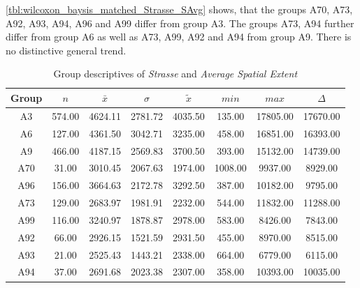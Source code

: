 \cref{tbl:wilcoxon_baysis_matched_Strasse_SAvg} shows, that the groups A70, A73, A92, A93, A94, A96 and A99 differ from group A3. The groups A73, A94 further differ from group A6 as well as A73, A99, A92 and A94 from group A9. There is no distinctive general trend.
\begin{table}[ht]
	\tiny
	\centering
	\begin{tabular}{c|c|c|c|c|c|c|c}
	  	\toprule
	 	Group & $n$ & $\bar{x}$ & $\sigma$ & $\tilde{x}$ & $min$ & $max$ & $\Delta$ \\  
	  	\midrule
		A3 & 574.00 & 4624.11 & 2781.72 & 4035.50 & 135.00 & 17805.00 & 17670.00 \\ 
	  	A6 & 127.00 & 4361.50 & 3042.71 & 3235.00 & 458.00 & 16851.00 & 16393.00 \\ 
	  	A9 & 466.00 & 4187.15 & 2569.83 & 3700.50 & 393.00 & 15132.00 & 14739.00 \\ 
	  	A70 & 31.00 & 3010.45 & 2067.63 & 1974.00 & 1008.00 & 9937.00 & 8929.00 \\ 
	  	A96 & 156.00 & 3664.63 & 2172.78 & 3292.50 & 387.00 & 10182.00 & 9795.00 \\ 
	  	A73 & 129.00 & 2683.97 & 1981.91 & 2232.00 & 544.00 & 11832.00 & 11288.00 \\ 
	  	A99 & 116.00 & 3240.97 & 1878.87 & 2978.00 & 583.00 & 8426.00 & 7843.00 \\ 
	  	A92 & 66.00 & 2926.15 & 1521.59 & 2931.50 & 455.00 & 8970.00 & 8515.00 \\ 
	  	A93 & 21.00 & 2525.43 & 1443.21 & 2338.00 & 664.00 & 6779.00 & 6115.00 \\ 
	  	A94 & 37.00 & 2691.68 & 2023.38 & 2307.00 & 358.00 & 10393.00 & 10035.00 \\ 
	   	\bottomrule
	\end{tabular}
	\caption{Group descriptives of \textit{Strasse} and \textit{Average Spatial Extent}}
	\label{tbl:descriptives_baysis_matched_Strasse_SAvg}
\end{table}
